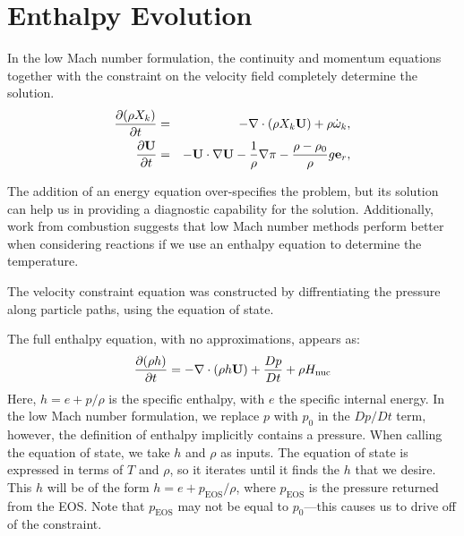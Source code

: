 \section{Enthalpy Evolution}

In the low Mach number formulation, the continuity and momentum
equations together with the constraint on the velocity field
completely determine the solution.
\begin{eqnarray}
\frac{\partial(\rho X_k)}{\partial t} &=& -\nabla\cdot(\rho X_k{\bf U}) + 
\rho\dot{\omega}_k,\label{eq:species}\\
\frac{\partial{\bf U}}{\partial t} &=& -{\bf U}\cdot\nabla{\bf U}  - 
  \frac{1}{\rho}\nabla\pi - 
  \frac{\rho-\rho_0}{\rho} g{\bf e}_r,\label{eq:momentum}
\end{eqnarray}

The addition of an energy equation over-specifies the problem, but its
solution can help us in providing a diagnostic capability for the
solution.  Additionally, work from combustion suggests that low Mach
number methods perform better when considering reactions if we use
an enthalpy equation to determine the temperature.

The velocity constraint equation was constructed by diffrentiating 
the pressure along particle paths, using the equation of state.  


The full enthalpy equation, with no approximations, appears as:
\begin{equation}
\frac{\partial(\rho h)}{\partial t} = -\nabla\cdot(\rho h{\bf U}) + 
  \frac{Dp}{Dt} + \rho{H_{\rm nuc}} \label{eq:enthalpy}
\end{equation}
Here, $h = e + p/\rho$ is the specific enthalpy, with $e$ the specific
internal energy.  In the low Mach number formulation, we replace $p$
with $p_0$ in the $Dp/Dt$ term, however, the definition of enthalpy
implicitly contains a pressure.  When calling the equation of state,
we take $h$ and $\rho$ as inputs.  The equation of state is expressed
in terms of $T$ and $\rho$, so it iterates until it finds the $h$ that
we desire.  This $h$ will be of the form $h = e + p_\mathrm{EOS}/\rho$,
where $p_\mathrm{EOS}$ is the pressure returned from the EOS.  Note that
$p_\mathrm{EOS}$ may not be equal to $p_0$---this causes us to drive
off of the constraint. 

